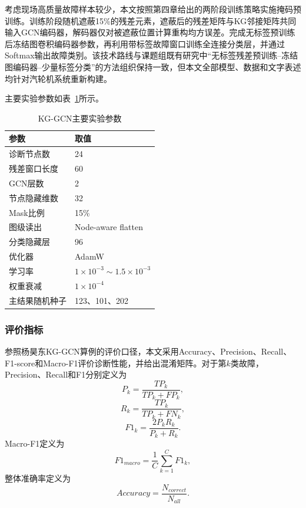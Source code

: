 考虑现场高质量故障样本较少，本文按照第四章给出的两阶段训练策略实施掩码预训练。训练阶段随机遮蔽15\%的残差元素，遮蔽后的残差矩阵与KG邻接矩阵共同输入GCN编码器，解码器仅对被遮蔽位置计算重构均方误差。完成无标签预训练后冻结图卷积编码器参数，再利用带标签故障窗口训练全连接分类层，并通过Softmax输出故障类别。该技术路线与课题组既有研究中“无标签残差预训练--冻结图编码器--少量标签分类”的方法组织保持一致\cite{YangHaodong2026CFB}，但本文全部模型、数据和文字表述均针对汽轮机系统重新构建。

主要实验参数如表~\ref{tab:kg_gcn_setting_v3}所示。

\begin{table}[htbp]
    \centering
    \caption{KG-GCN主要实验参数}
    \label{tab:kg_gcn_setting_v3}
    \begin{tabular}{ll}
        \toprule
        参数 & 取值 \\
        \midrule
        诊断节点数 & 24 \\
        残差窗口长度 & 60 \\
        GCN层数 & 2 \\
        节点隐藏维数 & 32 \\
        Mask比例 & 15\% \\
        图级读出 & Node-aware flatten \\
        分类隐藏层 & 96 \\
        优化器 & AdamW \\
        学习率 & $1\times10^{-3}\sim1.5\times10^{-3}$ \\
        权重衰减 & $1\times10^{-4}$ \\
        主结果随机种子 & 123、101、202 \\
        \bottomrule
    \end{tabular}
\end{table}

\subsubsection{评价指标}

参照杨昊东KG-GCN算例的评价口径\cite{YangHaodong2026CFB}，本文采用Accuracy、Precision、Recall、F1-score和Macro-F1评价诊断性能，并给出混淆矩阵。对于第$k$类故障，Precision、Recall和F1分别定义为
\begin{equation}
P_k=\frac{TP_k}{TP_k+FP_k},
\end{equation}
\begin{equation}
R_k=\frac{TP_k}{TP_k+FN_k},
\end{equation}
\begin{equation}
F1_k=\frac{2P_kR_k}{P_k+R_k}.
\end{equation}
Macro-F1定义为
\begin{equation}
F1_{macro}=\frac{1}{C}\sum_{k=1}^{C}F1_k,
\end{equation}
整体准确率定义为
\begin{equation}
Accuracy=\frac{N_{correct}}{N_{all}}.
\end{equation}

